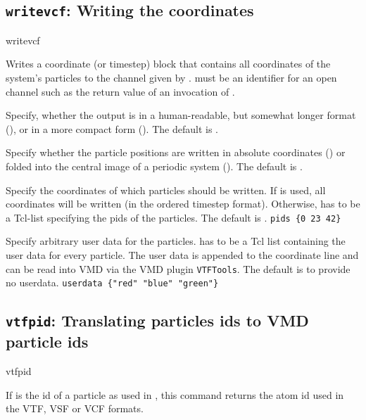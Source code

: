 \subsection{\texttt{writevcf}: Writing  the coordinates}

\begin{essyntax}
  writevcf  
\end{essyntax}
Writes a coordinate (or timestep) block that contains all coordinates
of the system's particles to the channel given by .
 must be an identifier for an open channel such as the
return value of an invocation of .

\begin{arguments}
\item[\opt{\alt{short \asep verbose}}] Specify, whether the output is
  in a human-readable, but somewhat longer format (),
  or in a more compact form (). The default is
  .
  
\item[\opt{\alt{folded \asep absolute}}] Specify whether the particle
  positions are written in absolute coordinates ()
  or folded into the central image of a periodic system
  (). The default is .
  
\item[\opt{pids \alt{\var{pids} \asep all}}] Specify the coordinates
  of which particles should be written. If  is used, all
  coordinates will be written (in the ordered timestep format).
  Otherwise,  has to be a Tcl-list specifying the pids of
  the particles. The default is .
   \verb!pids {0 23 42}!

\item[\opt{userdata \var{userdata}}] Specify arbitrary user data for
  the particles.  has to be a Tcl list containing the
  user data for every particle. The user data is appended to the
  coordinate line and can be read into VMD via the VMD plugin
  \texttt{VTFTools}. The default is to provide no userdata.
   \verb!userdata {"red" "blue" "green"}!
\end{arguments}


\subsection{\texttt{vtfpid}: Translating \es particles ids to VMD
  particle ids}
\begin{essyntax}
  vtfpid 
\end{essyntax}
If  is the id of a particle as used in \es, this command
returns the atom id used in the VTF, VSF or VCF formats.

